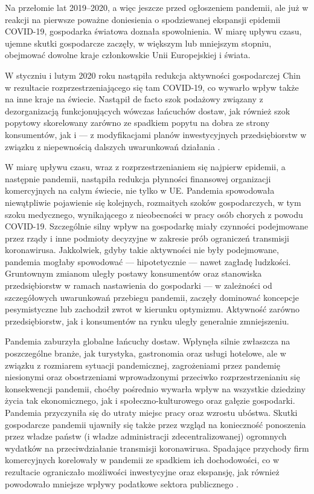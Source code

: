\documentclass[polish, twoside, 12pt, a4paper]{article}
\theoremstyle{definition}
\theoremstyle{plain}
\theoremstyle{remark}
\begin{document}
Na przełomie lat 2019--2020, a więc jeszcze przed ogłoszeniem pandemii, ale już w reakcji na pierwsze poważne doniesienia o spodziewanej ekspansji epidemii COVID-19, gospodarka światowa doznała spowolnienia. W miarę upływu czasu, ujemne skutki gospodarcze zaczęły, w większym lub mniejszym stopniu, obejmować dowolne kraje członkowskie Unii Europejskiej i świata.  

W styczniu i lutym 2020 roku nastąpiła redukcja aktywności gospodarczej Chin w rezultacie rozprzestrzeniającego się tam COVID-19, co wywarło wpływ także na inne kraje na świecie. Nastąpił de facto szok podażowy związany z dezorganizacją funkcjonujących wówczas łańcuchów dostaw, jak również szok popytowy skorelowany zarówno ze spadkiem popytu na dobra ze strony konsumentów, jak i --- z modyfikacjami planów inwestycyjnych przedsiębiorstw w związku z niepewnością dalszych uwarunkowań działania \citep{dziembala2021}. 

W miarę upływu czasu, wraz z rozprzestrzenianiem się najpierw epidemii, a następnie pandemii, nastąpiła redukcja płynności finansowej organizacji komercyjnych na całym świecie, nie tylko w UE. Pandemia spowodowała niewątpliwie pojawienie się kolejnych, rozmaitych szoków gospodarczych, w tym szoku medycznego, wynikającego z nieobecności w pracy osób chorych z powodu COVID-19. Szczególnie silny wpływ na gospodarkę miały czynności podejmowane przez rządy i inne podmioty decyzyjne w zakresie prób ograniczeń transmisji koronawirusa. Jakkolwiek, gdyby takie aktywności nie były podejmowane, pandemia mogłaby spowodować --- hipotetycznie --- nawet zagładę ludzkości. Gruntownym zmianom uległy postawy konsumentów oraz stanowiska przedsiębiorstw w ramach nastawienia do gospodarki --- w zależności od szczegółowych uwarunkowań przebiegu pandemii, zaczęły dominować koncepcje pesymistyczne lub zachodził zwrot w kierunku optymizmu. Aktywność zarówno przedsiębiorstw, jak i konsumentów na rynku uległy generalnie zmniejszeniu. 

Pandemia zaburzyła globalne łańcuchy dostaw. Wpłynęła silnie zwłaszcza na poszczególne branże, jak turystyka, gastronomia oraz usługi hotelowe, ale w związku z rozmiarem sytuacji pandemicznej, zagrożeniami przez pandemię niesionymi oraz obostrzeniami wprowadzonymi przeciwko rozprzestrzenianiu się konsekwencji pandemii, choćby pośrednio wywarła wpływ na wszystkie dziedziny życia tak ekonomicznego, jak i społeczno-kulturowego oraz gałęzie gospodarki. Pandemia przyczyniła się do utraty miejsc pracy oraz wzrostu ubóstwa. Skutki gospodarcze pandemii ujawniły się także przez wzgląd na konieczność ponoszenia przez władze państw (i władze administracji zdecentralizowanej) ogromnych wydatków na przeciwdziałanie transmisji koronawirusa. Spadające przychody firm komercyjnych korelowały w pandemii ze spadkiem ich dochodowości, co w rezultacie ograniczało możliwości inwestycyjne oraz ekspansję, jak również powodowało mniejsze wpływy podatkowe sektora publicznego \citep{dziembala2021}.  
\end{document}
